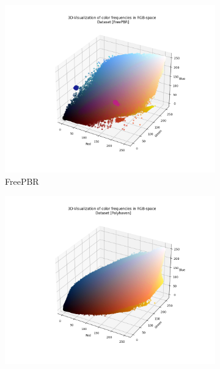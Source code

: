     \begin{figure}[htbp]
        \centering
        
        \begin{subfigure}{.33\textwidth}
          \centering
          \includegraphics[width=\linewidth]{../code/dataAnalysis/output/FreePBR.png}
          \caption{FreePBR}
          \label{fig:dataset-FreePBR}
        \end{subfigure}%
        \hfill
        \begin{subfigure}{.33\textwidth}
          \centering
          \includegraphics[width=\linewidth]{../code/dataAnalysis/output/Polyhaven.png}

\end{subfigure}
\end{figure}
